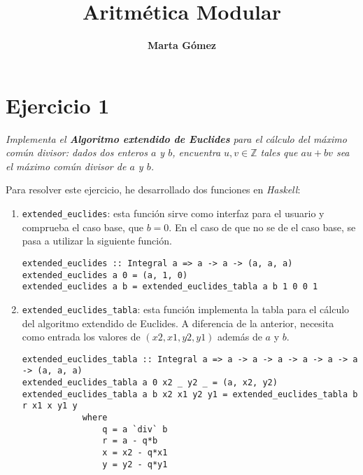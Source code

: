 \documentclass[10pt,spanish]{article}
\title{\fontfamily{pag}\selectfont \bfseries \Huge \color{rojo} Aritmética Modular}
\author{\fontfamily{pag}\selectfont \bfseries \LARGE Marta Gómez}
\begin{document}
\maketitle

\renewcommand{\tablename}{Tabla}

\section{\textcolor{rojo}Ejercicio 1}
\textit{Implementa el \textbf{\textcolor{rojo}{Algoritmo extendido de Euclides}} para el cálculo del máximo común divisor: dados dos enteros $a$ y $b$, encuentra $u, v \in \mathbb{Z}$ tales que $au + bv$ sea el máximo común divisor de $a$ y $b$.}

Para resolver este ejercicio, he desarrollado dos funciones en \textit{\textcolor{rojo}{Haskell}}:

\begin{enumerate}[---]
    \item \texttt{extended\_euclides}: esta función sirve como interfaz para el usuario y comprueba el caso base, que $b=0$. En el caso de que no se de el caso base, se pasa a utilizar la siguiente función.

\begin{verbatim}
extended_euclides :: Integral a => a -> a -> (a, a, a)
extended_euclides a 0 = (a, 1, 0)
extended_euclides a b = extended_euclides_tabla a b 1 0 0 1

\end{verbatim}

    \item \texttt{extended\_euclides\_tabla}: esta  función implementa la tabla para el cálculo del algoritmo extendido de Euclides. A diferencia de la anterior, necesita como entrada los valores de $(x2, x1, y2, y1)$ además de $a$ y $b$. 

\begin{verbatim}
extended_euclides_tabla :: Integral a => a -> a -> a -> a -> a -> a -> (a, a, a)
extended_euclides_tabla a 0 x2 _ y2 _ = (a, x2, y2)
extended_euclides_tabla a b x2 x1 y2 y1 = extended_euclides_tabla b r x1 x y1 y
            where
                q = a `div` b
                r = a - q*b
                x = x2 - q*x1
                y = y2 - q*y1

\end{verbatim}
\end{enumerate}
\end{document}
